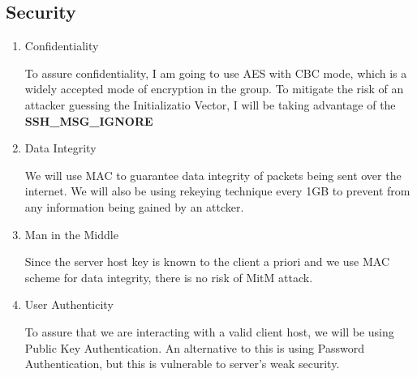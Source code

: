 \documentclass{article} %
\begin{document}
\subsection{Security}
\begin{enumerate}
    \item Confidentiality
    
    To assure confidentiality, I am going to use AES with CBC mode, which is a widely accepted mode of encryption in the group. To mitigate the risk of an attacker guessing the Initializatio Vector, I will be taking advantage of the \textbf{SSH\_MSG\_IGNORE}
    \item Data Integrity
    
    We will use MAC to guarantee data integrity of packets being sent over the internet. We will also be using rekeying technique every 1GB to prevent from any information being gained by an attcker.

    \item Man in the Middle
    
    Since the server host key is known to the client a priori and we use MAC scheme for data integrity, there is no risk of MitM attack.

    \item User Authenticity
    
    To assure that we are interacting with a valid client host, we will be using Public Key Authentication. An alternative to this is using Password Authentication, but this is vulnerable to server's weak security.
\end{enumerate}
\end{document}
